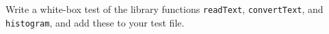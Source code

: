 \label{testHistogramEtc}
Write a white-box test of the library functions \lstinline{readText},
\lstinline{convertText}, and \lstinline{histogram}, and add these to
your test file.
